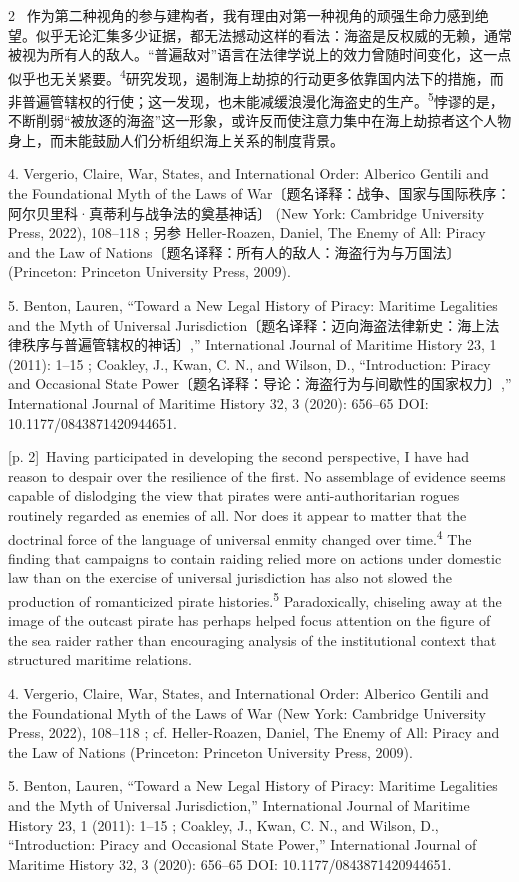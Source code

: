 \documentclass[10pt,a4paper]{article}
\begin{document}
\begin{paracol}{2}
\switchcolumn*
{\scriptsize\color{gray} [p. 2]}\ 作为第二种视角的参与建构者，我有理由对第一种视角的顽强生命力感到绝望。似乎无论汇集多少证据，都无法撼动这样的看法：海盗是反权威的无赖，通常被视为所有人的敌人。“普遍敌对”语言在法律学说上的效力曾随时间变化，这一点似乎也无关紧\mbox{要。\textsuperscript{4}}研究发现，遏制海上劫掠的行动更多依靠国内法下的措施，而非普遍管辖权的行使；这一发现，也未能减缓浪漫化海盗史的生\mbox{产。\textsuperscript{5}}悖谬的是，不断削弱“被放逐的海盗”这一形象，或许反而使注意力集中在海上劫掠者这个人物身上，而未能鼓励人们分析组织海上关系的制度背景。\par{\small 4. Vergerio, Claire, War, States, and International Order: Alberico Gentili and the Foundational Myth of the Laws of War〔题名译释：战争、国家与国际秩序：阿尔贝里科·真蒂利与战争法的奠基神话〕 (New York: Cambridge University Press, 2022), 108–118 ; 另参 Heller-Roazen, Daniel, The Enemy of All: Piracy and the Law of Nations〔题名译释：所有人的敌人：海盗行为与万国法〕 (Princeton: Princeton University Press, 2009).\par}{\small 5. Benton, Lauren, “Toward a New Legal History of Piracy: Maritime Legalities and the Myth of Universal Jurisdiction〔题名译释：迈向海盗法律新史：海上法律秩序与普遍管辖权的神话〕,” International Journal of Maritime History 23, 1 (2011): 1–15 ; Coakley, J., Kwan, C. N., and Wilson, D., “Introduction: Piracy and Occasional State Power〔题名译释：导论：海盗行为与间歇性的国家权力〕,” International Journal of Maritime History 32, 3 (2020): 656–65 DOI: 10.1177/0843871420944651.\par}
\switchcolumn
{\scriptsize\color{gray} [p. 2]}\ Having participated in developing the second perspective, I have had reason to despair over the resilience of the first. No assemblage of evidence seems capable of dislodging the view that pirates were anti-authoritarian rogues routinely regarded as enemies of all. Nor does it appear to matter that the doctrinal force of the language of universal enmity changed over time.\nobreak\textsuperscript{4} The finding that campaigns to contain raiding relied more on actions under domestic law than on the exercise of universal jurisdiction has also not slowed the production of romanticized pirate histories.\nobreak\textsuperscript{5} Paradoxically, chiseling away at the image of the outcast pirate has perhaps helped focus attention on the figure of the sea raider rather than encouraging analysis of the institutional context that structured maritime relations.\par{\small 4. Vergerio, Claire, War, States, and International Order: Alberico Gentili and the Foundational Myth of the Laws of War (New York: Cambridge University Press, 2022), 108–118 ; cf. Heller-Roazen, Daniel, The Enemy of All: Piracy and the Law of Nations (Princeton: Princeton University Press, 2009).\par}{\small 5. Benton, Lauren, “Toward a New Legal History of Piracy: Maritime Legalities and the Myth of Universal Jurisdiction,” International Journal of Maritime History 23, 1 (2011): 1–15 ; Coakley, J., Kwan, C. N., and Wilson, D., “Introduction: Piracy and Occasional State Power,” International Journal of Maritime History 32, 3 (2020): 656–65 DOI: 10.1177/0843871420944651.\par}

\end{paracol}
\end{document}
